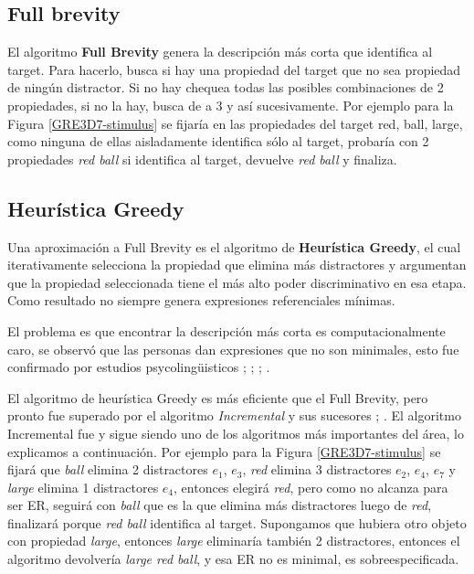  

\subsection{Full brevity}

El algoritmo {\bf Full Brevity} \cite{Dale:1989:CUR:981623.981632} genera la descripci\'on m\'as corta que identifica al target. Para hacerlo, 
busca si hay una propiedad del target que no sea propiedad de ning\'un distractor. Si no hay chequea todas las posibles combinaciones de 2 propiedades, si no la hay, busca de a 3 y as\'i sucesivamente. Por ejemplo para la Figura \ref{GRE3D7-stimulus} se fijar\'ia en las propiedades del target {red, ball, large}, como ninguna de ellas aisladamente identifica s\'olo al target, probar\'ia con 2 propiedades {\it red ball} si identifica al target, devuelve {\it red ball} y finaliza.

\subsection{Heur\'istica Greedy}

Una aproximaci\'on a Full Brevity es el algoritmo de {\bf Heur\'istica Greedy}, el cual iterativamente selecciona la propiedad que elimina m\'as distractores y argumentan que la propiedad seleccionada tiene el m\'as alto poder discriminativo en esa etapa. Como resultado no siempre genera expresiones referenciales m\'inimas.

El problema es que encontrar la descripci\'on m\'as corta es computacionalmente caro, se observ\'o que las personas dan expresiones que no son minimales, esto fue confirmado por estudios psycoling\"uisticos \cite{Olson1970LangAndThought};  \cite{Sonnenschein1984}; \cite{Pechmann1989}; \cite{Engelhardt2006}.

El algoritmo de heur\'istica Greedy es m\'as eficiente que el Full Brevity, pero pronto fue superado por el algoritmo {\it Incremental} y sus sucesores \cite{C92-1038}; \cite{Dale95computationalinterpretations}. El algoritmo Incremental fue y sigue siendo uno de los algoritmos m\'as importantes del \'area, lo explicamos a continuaci\'on. Por ejemplo para la Figura \ref{GRE3D7-stimulus} se fijar\'a que {\it ball} elimina 2 distractores {$e_{1}$, $e_{3}$}, {\it red} elimina 3 distractores {$e_{2}$, $e_{4}$, $e_{7}$} y {\it large} elimina 1 distractores {$e_{4}$}, entonces elegir\'a {\it red}, pero como no alcanza para ser ER, seguir\'a con {\it ball} que es la que elimina m\'as distractores luego de {\it red}, finalizar\'a porque {\it red ball} identifica al target. Supongamos que hubiera otro objeto con propiedad {\it large}, entonces {\it large} eliminar\'ia tambi\'en 2 distractores, entonces el algoritmo devolver\'ia {\it large red ball}, y esa ER no es minimal, es sobreespecificada.

